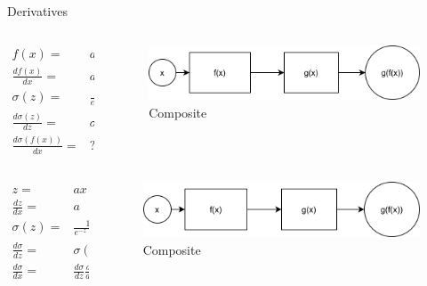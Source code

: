 \begin{frame}[allowframebreaks]{Derivatives}
	\begin{columns}
		\begin{column}{.5\textwidth}
			\begin{align}
				f(x)=&ax+b \\
				\frac{df(x)}{dx} =& a \\
				\sigma(z) =&\frac{1}{e^{-z}+1} \\
				\frac{d\sigma(z)}{dz} =& \sigma(z)(1-\sigma(z)) \\
				\frac{d\sigma(f(x))}{dx}=&?
			\end{align}
		\end{column}
		\begin{column}{.5\textwidth}
			\begin{figure}
				\includegraphics[width=.8\textwidth, center]{figures/function_composition}
				\caption*{Composite}
			\end{figure}
		\end{column}
	\end{columns}

	\framebreak
	
	\begin{columns}
		\begin{column}{.5\textwidth}
			\begin{align}
				z=&ax+b \\
				\frac{dz}{dx} =& a \\
				\sigma(z) =&\frac{1}{e^{-z}+1} \\
				\frac{d\sigma}{dz} =& \sigma(z)(1-\sigma(z)) \\
				\frac{d\sigma}{dx}=&\frac{d\sigma}{dz} \frac{dz}{dx} 
			\end{align}
		\end{column}
		\begin{column}{.5\textwidth}
			\begin{figure}
				\includegraphics[width=.8\textwidth, center]{figures/function_composition}
				\caption*{Composite}
			\end{figure}
		\end{column}
	\end{columns}


\end{frame}
